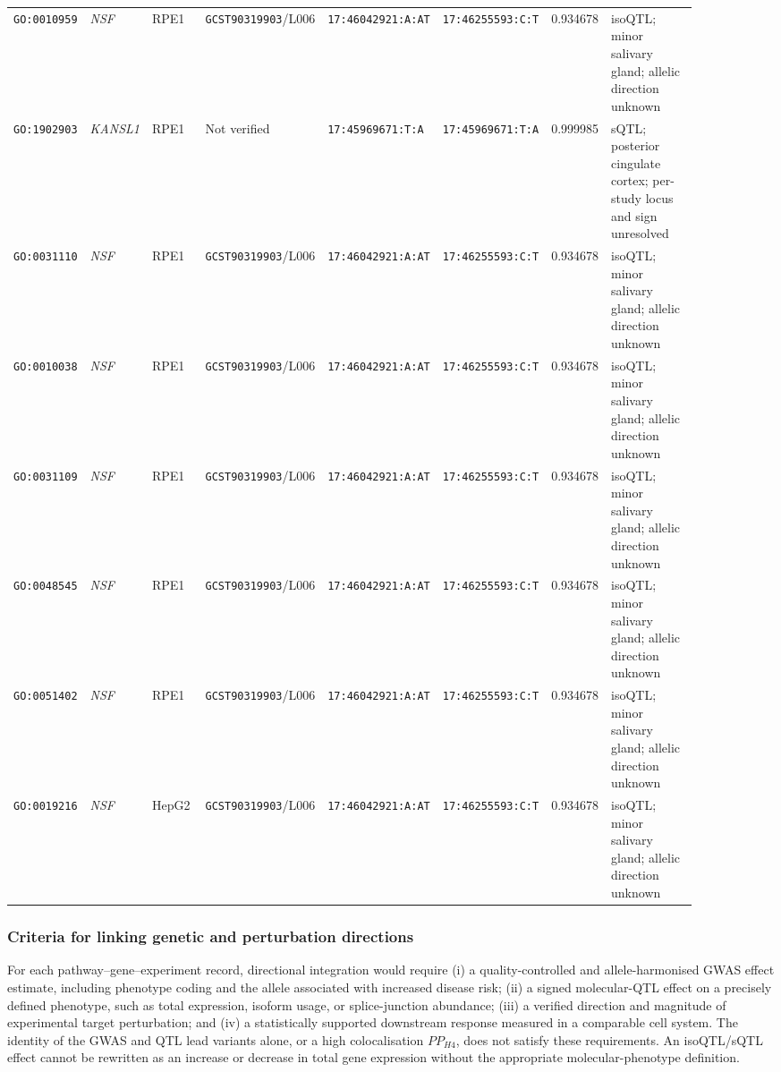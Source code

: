 \documentclass[11pt,a4paper]{article}
\begin{document}
\begin{landscape}
\begin{longtable}{@{}p{0.105\linewidth}p{0.075\linewidth}p{0.08\linewidth}p{0.135\linewidth}p{0.14\linewidth}p{0.14\linewidth}p{0.07\linewidth}p{0.145\linewidth}@{}}
\texttt{GO:0010959} & \textit{NSF} & RPE1 & \texttt{GCST90319903}/L006 & \texttt{17:46042921:A:AT} & \texttt{17:46255593:C:T} & 0.934678 & isoQTL; minor salivary gland; allelic direction unknown \\
\texttt{GO:1902903} & \textit{KANSL1} & RPE1 & Not verified & \texttt{17:45969671:T:A} & \texttt{17:45969671:T:A} & 0.999985 & sQTL; posterior cingulate cortex; per-study locus and sign unresolved \\
\texttt{GO:0031110} & \textit{NSF} & RPE1 & \texttt{GCST90319903}/L006 & \texttt{17:46042921:A:AT} & \texttt{17:46255593:C:T} & 0.934678 & isoQTL; minor salivary gland; allelic direction unknown \\
\texttt{GO:0010038} & \textit{NSF} & RPE1 & \texttt{GCST90319903}/L006 & \texttt{17:46042921:A:AT} & \texttt{17:46255593:C:T} & 0.934678 & isoQTL; minor salivary gland; allelic direction unknown \\
\texttt{GO:0031109} & \textit{NSF} & RPE1 & \texttt{GCST90319903}/L006 & \texttt{17:46042921:A:AT} & \texttt{17:46255593:C:T} & 0.934678 & isoQTL; minor salivary gland; allelic direction unknown \\
\texttt{GO:0048545} & \textit{NSF} & RPE1 & \texttt{GCST90319903}/L006 & \texttt{17:46042921:A:AT} & \texttt{17:46255593:C:T} & 0.934678 & isoQTL; minor salivary gland; allelic direction unknown \\
\texttt{GO:0051402} & \textit{NSF} & RPE1 & \texttt{GCST90319903}/L006 & \texttt{17:46042921:A:AT} & \texttt{17:46255593:C:T} & 0.934678 & isoQTL; minor salivary gland; allelic direction unknown \\
\texttt{GO:0019216} & \textit{NSF} & HepG2 & \texttt{GCST90319903}/L006 & \texttt{17:46042921:A:AT} & \texttt{17:46255593:C:T} & 0.934678 & isoQTL; minor salivary gland; allelic direction unknown \\
\end{longtable}\endgroup
\end{landscape}


\subsubsection{Criteria for linking genetic and perturbation directions}
\label{subsec:step17_direction}
For each pathway--gene--experiment record, directional integration would require (i) a quality-controlled and allele-harmonised GWAS effect estimate, including phenotype coding and the allele associated with increased disease risk; (ii) a signed molecular-QTL effect on a precisely defined phenotype, such as total expression, isoform usage, or splice-junction abundance; (iii) a verified direction and magnitude of experimental target perturbation; and (iv) a statistically supported downstream response measured in a comparable cell system. The identity of the GWAS and QTL lead variants alone, or a high colocalisation $PP_{H4}$, does not satisfy these requirements. An isoQTL/sQTL effect cannot be rewritten as an increase or decrease in total gene expression without the appropriate molecular-phenotype definition.
\end{document}
